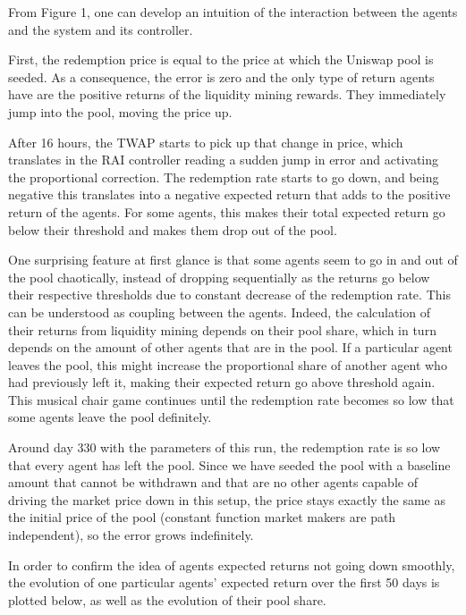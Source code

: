 \documentclass{article}
\begin{document}
    From Figure 1, one can develop an intuition of the interaction between the agents and the system and its controller. 
    
    First, the redemption price is equal to the price at which the Uniswap pool is seeded. As a consequence, the error is zero and the only type of return agents have are the positive returns of the liquidity mining rewards. They immediately jump into the pool, moving the price up. 
    
    After 16 hours, the TWAP starts to pick up that change in price, which translates in the RAI controller reading a sudden jump in error and activating the proportional correction. The redemption rate starts to go down, and being negative this translates into a negative expected return that adds to the positive return of the agents. For some agents, this makes their total expected return go below their threshold and makes them drop out of the pool. 

    One surprising feature at first glance is that some agents seem to go in and out of the pool chaotically, instead of dropping sequentially as the returns go below their respective thresholds due to constant decrease of the redemption rate. This can be understood as coupling between the agents. Indeed, the calculation of their returns from liquidity mining depends on their pool share, which in turn depends on the amount of other agents that are in the pool. If a particular agent leaves the pool, this might increase the proportional share of another agent who had previously left it, making their expected return go above threshold again. This musical chair game continues until the redemption rate becomes so low that some agents leave the pool definitely. 
    
    Around day 330 with the parameters of this run, the redemption rate is so low that every agent has left the pool. Since we have seeded the pool with a baseline amount that cannot be withdrawn and that are no other agents capable of driving the market price down in this setup, the price stays exactly the same as the initial price of the pool (constant function market makers are path independent), so the error grows indefinitely. 

    In order to confirm the idea of agents expected returns not going down smoothly, the evolution of one particular agents' expected return over the first 50 days is plotted below, as well as the evolution of their pool share.
\end{document}
